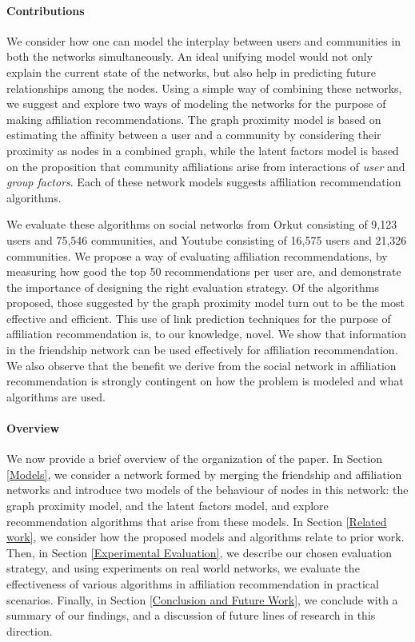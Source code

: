 \documentclass{sig-alternate}
\begin{document}
\paragraph*{Contributions}
We consider how one can model the interplay between users and communities in both the networks simultaneously. An ideal unifying model would not only explain the current state of the networks, but also help in predicting future relationships among the nodes. Using a simple way of combining these networks, we suggest and explore two ways of modeling the networks for the purpose of making affiliation recommendations. The graph proximity model is based on estimating the affinity between a user and a community by considering their proximity as nodes in a combined graph, while the latent factors model is based on the proposition that community affiliations arise from interactions of \textit{user} and \textit{group factors}. Each of these network models suggests affiliation recommendation algorithms.

We evaluate these algorithms on social networks from Orkut consisting of 9,123 users and 75,546 communities, and Youtube consisting of 16,575 users and 21,326 communities. We propose a way of evaluating affiliation recommendations, by measuring how good the top 50 recommendations per user are, and demonstrate the importance of designing the right evaluation strategy. Of the algorithms proposed, those suggested by the graph proximity model turn out to be the most effective and efficient. This use of link prediction techniques for the purpose of affiliation recommendation is, to our knowledge, novel. We show that information in the friendship network can be used effectively for affiliation recommendation. We also observe that the benefit we derive from the social network in affiliation recommendation is strongly contingent on how the problem is modeled and what algorithms are used.

\paragraph*{Overview}
We now provide a brief overview of the organization of the paper. In Section \ref{Models}, we consider a network formed by merging the friendship and affiliation networks and introduce two models of the behaviour of nodes in this network: the graph proximity model, and the latent factors model, and explore recommendation algorithms that arise from these models. In Section \ref{Related work}, we consider how the proposed models and algorithms relate to prior work. Then, in Section \ref{Experimental Evaluation}, we describe our chosen evaluation strategy, and using experiments on real world networks, we evaluate the effectiveness of various algorithms in affiliation recommendation in practical scenarios. Finally, in Section \ref{Conclusion and Future Work}, we conclude with a summary of our findings, and a discussion of future lines of research in this direction.
\end{document}
